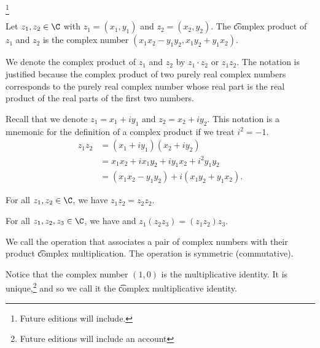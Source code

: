 
\footnote{Future editions will include.}


Let $z_1, z_2 \in \C$ with $z_1 = (x_1, y_1)$ and $z_2 = (x_2, y_2)$.
The \t{complex product} of $z_1$ and $z_2$ is the complex number $(x_1x_2 - y_1y_2, x_1y_2 + y_1x_2)$.


We denote the complex product of $z_1$ and $z_2$ by $z_1 \cdot z_2$ or $z_1z_2$.
The notation is justified because the complex product of two purely real complex numbers corresponds to the purely real complex number whose real part is the real product of the real parts of the first two numbers.

Recall that we denote $z_1 = x_1 + iy_1$ and $z_2 = x_2 + iy_2$.
This notation is a mnemonic for the definition of a complex product if we treat $i^2 = -1$.
\[
\begin{aligned}
	z_1z_2 &= (x_1 + iy_1)(x_2 + iy_2) \\
		   &= x_1x_2 + ix_1y_2 + iy_1x_2 + i^2 y_1y_2 \\
		   &= (x_1x_2 - y_1y_2) + i(x_1y_2 + y_1x_2).
\end{aligned}
\]


\begin{proposition}[Commutativity]
For all $z_1, z_2 \in \C$,
  we have
  $z_1z_2 = z_2z_2$.
\end{proposition}

\begin{proposition}[Associativity]
For all $z_1, z_2, z_3 \in \C$, we have
  and $z_1(z_2z_3) = (z_1z_2)z_3$.
\end{proposition}


We call the operation that associates a pair of complex numbers with their product \t{complex multiplication}.
The operation is symmetric (commutative).


Notice that the complex number $(1, 0)$ is the multiplicative identity.
It is unique,\footnote{Future editions will include an account} and so we call it the \t{complex multiplicative identity.}


\blankpage
